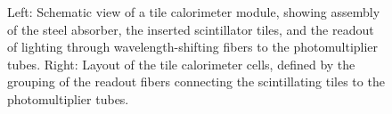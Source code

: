 \begin{figure}[htbp]
	\centering
	\hfill
	\caption{Left: Schematic view of a tile calorimeter module, showing assembly of the steel absorber, the inserted scintillator tiles, and the readout of lighting through wavelength-shifting fibers to the photomultiplier tubes. Right: Layout of the tile calorimeter cells, defined by the grouping of the readout fibers connecting the scintillating tiles to the photomultiplier tubes.}
	\label{fig:ATLAS-calorimeters-tile}
\end{figure}



